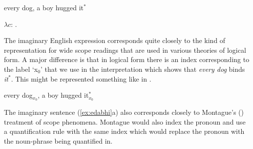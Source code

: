 \begin{ex} 
\begin{subex} 
 
\item every dog, a boy hugged it$^*$ 
 
\item %
  $\lambda c$: . \\
  \hspace*{1em}

 
\end{subex} 
\label{ex:edabhi}   
\end{ex} 
The imaginary English expression  corresponds quite closely
to the kind of representation for wide scope readings that are used in
various theories of logical form.  A major difference is that in
logical form there is an index corresponding to the label `x$_0$' that
we use in the interpretation which shows that \textit{every dog} binds
\textit{it$^*$}.  This might be represented something like in
\nexteg{}.
\begin{ex} 
every dog$_{x_0}$, a boy hugged it$^*_{x_0}$ 
\end{ex} 
The imaginary sentence (\ref{ex:edabhi}a) also corresponds closely to
Montague's (\citeyear{Montague1973}) treatment of scope phenomena.
Montague would also index the pronoun and use a quantification rule
with the same index which would replace the pronoun with the
noun-phrase being quantified in.

